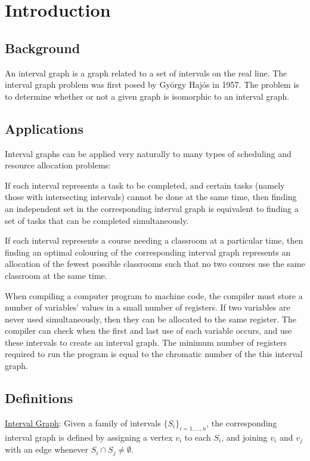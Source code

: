 \documentclass[11pt]{article}
\begin{document}
\section{Introduction}

\subsection{Background}

An interval graph is a graph related to a set of intervals on the real line.
The interval graph problem was first posed by Gy\"orgy Haj\'os in 1957.
\cite{Golumbic} The problem is to determine whether or not a given graph is isomorphic to an interval graph.


\subsection{Applications}

Interval graphs can be applied very naturally to many types of scheduling and resource allocation problems:

If each interval represents a task to be completed, and certain tasks (namely those with intersecting intervals) cannot be done at the same time, then finding an independent set in the corresponding interval graph is equivalent to finding a set of tasks that can be completed simultaneously.

If each interval represents a course needing a classroom at a particular time, then finding an optimal colouring of the corresponding interval graph represents an allocation of the fewest possible classrooms such that no two courses use the same classroom at the same time.

When compiling a computer program to machine code, the compiler must store a number of variables' values in a small number of registers.
If two variables are never used simultaneously, then they can be allocated to the same register.
The compiler can check when the first and last use of each variable occurs, and use these intervals to create an interval graph.
The minimum number of registers required to run the program is equal to the chromatic number of the this interval graph.


\subsection{Definitions}

\underline{Interval Graph}: Given a family of intervals $\{S_i\}_{i=1,\ldots,n}$, the corresponding interval graph is defined by assigning a vertex $v_i$ to each $S_i$, and joining $v_i$ and $v_j$ with an edge whenever $S_i\cap S_j\neq\emptyset$.
\end{document}
